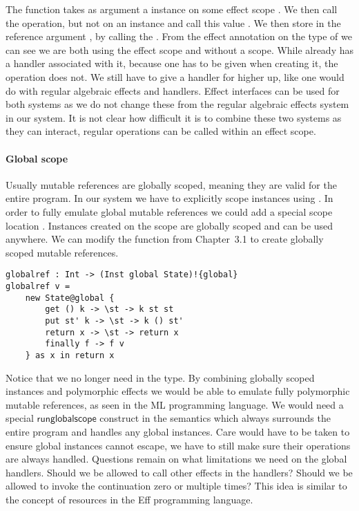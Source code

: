The function  takes as argument a  instance on some effect scope .
We then call the  operation, but not on an instance and call this value .
We then store  in the reference argument , by calling the .
From the effect annotation on the type of  we can see we are both using the effect scope  and  without a scope.
While  already has a handler associated with it, because one has to be given when creating it, the  operation does not.
We still have to give a handler for  higher up, like one would do with regular algebraic effects and handlers.
Effect interfaces can be used for both systems as we do not change these from the regular algebraic effects system in our system.
It is not clear how difficult it is to combine these two systems as they can interact, regular operations can be called within an effect scope.

\paragraph{Global scope}
Usually mutable references are globally scoped, meaning they are valid for the entire program.
In our system we have to explicitly scope instances using .
In order to fully emulate global mutable references we could add a special scope location .
Instances created on the  scope are globally scoped and can be used anywhere.
We can modify the  function from Chapter~3.1 to create globally scoped mutable references.
\begin{verbatim}
globalref : Int -> (Inst global State)!{global}
globalref v =
	new State@global {
		get () k -> \st -> k st st
		put st' k -> \st -> k () st'
		return x -> \st -> return x
		finally f -> f v
	} as x in return x
\end{verbatim}

Notice that we no longer need  in the type.
By combining globally scoped instances and polymorphic effects we would be able to emulate fully polymorphic mutable references, as seen in the ML programming language.
We would need a special $\mathsf{runglobalscope}$ construct in the semantics which always surrounds the entire program and handles any global instances.
Care would have to be taken to ensure global instances cannot escape, we have to still make sure their operations are always handled.
Questions remain on what limitations we need on the global handlers.
Should we be allowed to call other effects in the handlers?
Should we be allowed to invoke the continuation zero or multiple times?
This idea is similar to the concept of resources in the Eff programming language.
